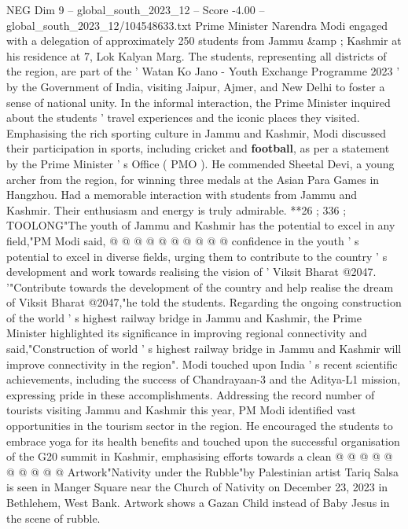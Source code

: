 \begin{textsample}{NEG Dim 9 – global\_south\_2023\_12 – Score -4.00 – global\_south\_2023\_12/104548633.txt}  \label{ex:f9_neg_309}
Prime Minister Narendra Modi engaged with a delegation of approximately 250 students from Jammu \&amp ; Kashmir at his residence at 7, Lok Kalyan Marg.
The students, representing all districts of the region, are part of the ' Watan Ko Jano - Youth Exchange Programme 2023 ' by the Government of India, visiting Jaipur, Ajmer, and New Delhi to foster a sense of national unity.
In the informal interaction, the Prime Minister inquired about the students ' travel experiences and the iconic places they visited.
Emphasising the rich sporting culture in Jammu and Kashmir, Modi discussed their participation in sports, including cricket and \textbf{football}, as per a statement by the Prime Minister ' s Office ( PMO ).
He commended Sheetal Devi, a young archer from the region, for winning three medals at the Asian Para Games in Hangzhou.
Had a memorable interaction with students from Jammu and Kashmir.
Their enthusiasm and energy is truly admirable. **26 ; 336 ; TOOLONG"The youth of Jammu and Kashmir has the potential to excel in any field,"PM Modi said, @ @ @ @ @ @ @ @ @ @ confidence in the youth ' s potential to excel in diverse fields, urging them to contribute to the country ' s development and work towards realising the vision of ' Viksit Bharat @2047. '"Contribute towards the development of the country and help realise the dream of Viksit Bharat @2047,"he told the students.
Regarding the ongoing construction of the world ' s highest railway bridge in Jammu and Kashmir, the Prime Minister highlighted its significance in improving regional connectivity and said,"Construction of world ' s highest railway bridge in Jammu and Kashmir will improve connectivity in the region".
Modi touched upon India ' s recent scientific achievements, including the success of Chandrayaan-3 and the Aditya-L1 mission, expressing pride in these accomplishments.
Addressing the record number of tourists visiting Jammu and Kashmir this year, PM Modi identified vast opportunities in the tourism sector in the region.
He encouraged the students to embrace yoga for its health benefits and touched upon the successful organisation of the G20 summit in Kashmir, emphasising efforts towards a clean @ @ @ @ @ @ @ @ @ @ Artwork"Nativity under the Rubble"by Palestinian artist Tariq Salsa is seen in Manger Square near the Church of Nativity on December 23, 2023 in Bethlehem, West Bank.
Artwork shows a Gazan Child instead of Baby Jesus in the scene of rubble.

\end{textsample}

